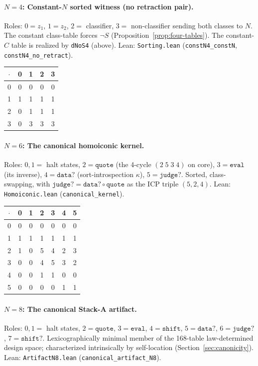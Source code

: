\documentclass[sigconf,screen]{acmart}
\newcommand{\dotop}{\cdot}
\theoremstyle{remark}
\begin{document}
\paragraph{$N\!=\!4$: Constant-$N$ sorted witness (no retraction pair).}
Roles: $0 = z_1$, $1 = z_2$, $2 =$ classifier, $3 =$ non-classifier sending both classes to $N$. The constant class-table forces $\neg S$ (Proposition~\ref{prop:four-tables}). The constant-$C$ table is realized by \texttt{dNoS4} (above). \quad Lean: \texttt{Sorting.lean} (\texttt{constN4\_constN}, \texttt{constN4\_no\_retract}).

\medskip
{\small
\begin{tabular}{c|cccc}
$\dotop$ & 0 & 1 & 2 & 3 \\\hline
0 & 0 & 0 & 0 & 0 \\
1 & 1 & 1 & 1 & 1 \\
2 & 0 & 1 & 1 & 1 \\
3 & 0 & 3 & 3 & 3 \\
\end{tabular}}

\paragraph{$N\!=\!6$: The canonical homoiconic kernel.}
Roles: $0, 1 =$ halt states, $2 = \texttt{quote}$ (the 4-cycle $(2\;5\;3\;4)$ on core), $3 = \texttt{eval}$ (its inverse), $4 = \texttt{data?}$ (sort-introspection $\kappa$), $5 = \texttt{judge?}$. Sorted, class-swapping, with $\texttt{judge?} = \texttt{data?} \circ \texttt{quote}$ as the ICP triple $(5, 2, 4)$. \quad Lean: \texttt{Homoiconic.lean} (\texttt{canonical\_kernel}).

\medskip
{\small
\begin{tabular}{c|cccccc}
$\dotop$ & 0 & 1 & 2 & 3 & 4 & 5 \\\hline
0 & 0 & 0 & 0 & 0 & 0 & 0 \\
1 & 1 & 1 & 1 & 1 & 1 & 1 \\
2 & 1 & 0 & 5 & 4 & 2 & 3 \\
3 & 0 & 0 & 4 & 5 & 3 & 2 \\
4 & 0 & 0 & 1 & 1 & 0 & 0 \\
5 & 0 & 0 & 0 & 0 & 1 & 1 \\
\end{tabular}}

\paragraph{$N\!=\!8$: The canonical Stack-A artifact.}
Roles: $0, 1 =$ halt states, $2 = \texttt{quote}$, $3 = \texttt{eval}$, $4 = \texttt{shift}$, $5 = \texttt{data?}$, $6 = \texttt{judge?}$, $7 = \texttt{shift?}$. Lexicographically minimal member of the 168-table law-determined design space; characterized intrinsically by self-location (Section~\ref{sec:canonicity}). \quad Lean: \texttt{ArtifactN8.lean} (\texttt{canonical\_artifact\_N8}).
\end{document}
